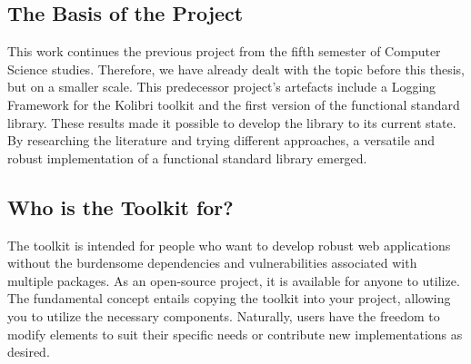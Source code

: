 \subsection{The Basis of the Project}
\label{sub:The Basis of the Project}
This work continues the previous project from the fifth semester of Computer
Science studies. Therefore, we have already dealt with the topic before this thesis,
but on a smaller scale. This predecessor project's artefacts include a Logging Framework
for the Kolibri toolkit and the first version of the functional standard
library. These results made it possible to develop the library to its current
state. By researching the literature and trying different approaches, a
versatile and robust implementation of a functional standard library emerged.

\subsection{Who is the Toolkit for?}
\label{sub:Who is the Toolkit for?}
The toolkit is intended for people who want to develop robust web applications
without the burdensome dependencies and vulnerabilities associated with
multiple packages. As an open-source project, it is available for anyone to
utilize. The fundamental concept entails copying the toolkit into your project,
allowing you to utilize the necessary components. Naturally, users have the
freedom to modify elements to suit their specific needs or contribute new
implementations as desired.
